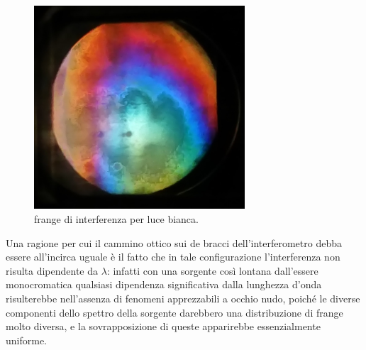 \begin{figure} [H]
	\centering
	\includegraphics[width=0.7\textwidth]{./pictures/frange.jpg}
	\caption{frange di interferenza per luce bianca.}
	\label{fig:frangeb}
\end{figure}


Una ragione per cui il cammino ottico sui
de bracci dell'interferometro debba essere all'incirca uguale è
 il fatto che in tale configurazione l'interferenza non risulta
dipendente da $\lambda$: infatti con una sorgente così lontana
dall'essere monocromatica qualsiasi dipendenza significativa dalla
lunghezza d'onda risulterebbe nell'assenza di fenomeni apprezzabili a occhio nudo,
poiché le diverse componenti dello spettro della sorgente darebbero una distribuzione di frange
molto diversa, e la sovrapposizione di queste apparirebbe essenzialmente uniforme.